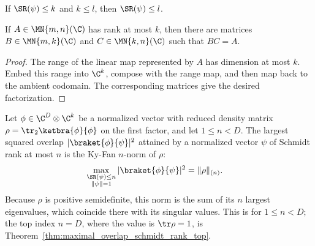 \begin{lemma}\label{lem:schmidt_rank_mono}
    \leanok
    If $\SR(\psi)\le k$ and $k\le l$, then $\SR(\psi)\le l$.
\end{lemma}

\begin{lemma}
    \label{lem:matrix_rank_factorization_coordinate}
    \leanok
    If $A\in\MN{m,n}(\C)$ has rank at most $k$, then there are matrices
    $B\in\MN{m,k}(\C)$ and $C\in\MN{k,n}(\C)$ such that $BC=A$.
\end{lemma}

\begin{proof}
    \leanok
    The range of the linear map represented by $A$ has dimension at most $k$.
    Embed this range into $\C^k$, compose with the range map, and then map
    back to the ambient codomain. The corresponding matrices give the desired
    factorization.
\end{proof}

\begin{theorem}
    \label{thm:maximal_overlap_schmidt_rank}
    \leanok
    Let $\phi\in\C^{D}\otimes\C^k$ be a normalized vector with reduced density
    matrix $\rho=\tr_2\ketbra{\phi}{\phi}$ on the first factor, and let
    $1\le n<D$. The largest squared overlap $|\braket{\phi}{\psi}|^2$ attained
    by a normalized vector $\psi$ of Schmidt rank at most $n$ is the Ky-Fan
    $n$-norm of $\rho$:
    \begin{align}
        \max_{\substack{\SR(\psi)\le n\\ \|\psi\|=1}}
        |\braket{\phi}{\psi}|^2
         & =\|\rho\|_{(n)}.
        \label{eq:schwarz_maximal_schmidt_overlap}
    \end{align}
    Because $\rho$ is positive semidefinite, this norm is the sum of its $n$
    largest eigenvalues, which coincide there with its singular values. This is
    \cite[Lemma~3.1]{Wolf2012Quantum} for $1\le n<D$; the top index $n=D$,
    where the value is $\tr\rho=1$, is
    Theorem~\ref{thm:maximal_overlap_schmidt_rank_top}.
\end{theorem}

